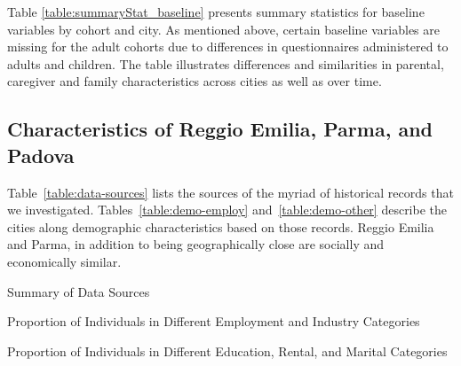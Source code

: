 Table \ref{table:summaryStat_baseline} presents summary statistics for baseline variables by cohort and city. As mentioned above, certain baseline variables are missing for the adult cohorts due to differences in questionnaires administered to adults and children. The table illustrates differences and similarities in parental, caregiver and family characteristics across cities as well as over time.

\begin{landscape}

\end{landscape}

\subsection{Characteristics of Reggio Emilia, Parma, and Padova}
\label{app:characteristics-cities}

Table~\ref{table:data-sources} lists the sources of the myriad of historical records that we investigated. Tables~\ref{table:demo-employ} and~\ref{table:demo-other} describe the cities along demographic characteristics based on those records. Reggio Emilia and Parma, in addition to being geographically close are socially and economically similar. 

\begin{table}[H]
\centering
	\caption{Summary of Data Sources} \label{table:data-sources}
	
\end{table}

\begin{landscape}
\begin{table}[ht!]
\begin{center}
\scriptsize{
	\caption{Proportion of Individuals in Different Employment and Industry Categories} \label{table:demo-employ}
	
}
\end{center}
\end{table}
\end{landscape}

\begin{landscape}
\begin{table}[ht!]
\begin{center}
\scriptsize{
	\caption{Proportion of Individuals in Different Education, Rental, and Marital Categories} \label{table:demo-other}
	
}
\end{center}
\end{table}
\end{landscape}



